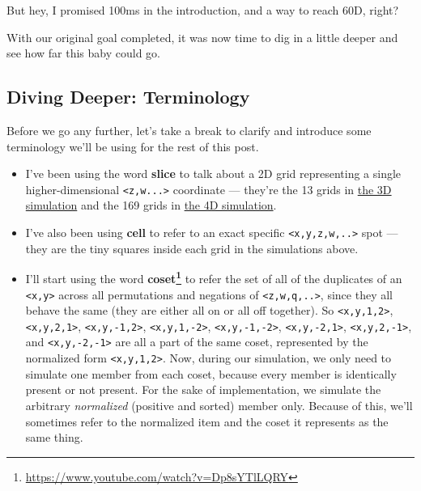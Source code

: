 \documentclass[]{article}
\renewcommand{\href}[2]{#2\footnote{\url{#1}}}
\begin{document}
But hey, I promised 100ms in the introduction, and a way to reach 60D, right?

With our original goal completed, it was now time to dig in a little deeper and
see how far this baby could go.

\hypertarget{diving-deeper-terminology}{%
\subsection{Diving Deeper: Terminology}\label{diving-deeper-terminology}}

Before we go any further, let's take a break to clarify and introduce some
terminology we'll be using for the rest of this post.

\begin{itemize}
\item
  I've been using the word \textbf{slice} to talk about a 2D grid representing a
  single higher-dimensional \texttt{\textless{}z,w...\textgreater{}} coordinate
  --- they're the 13 grids in \protect\hyperlink{gol3D}{the 3D simulation} and
  the 169 grids in \protect\hyperlink{gol4D}{the 4D simulation}.
\item
  I've also been using \textbf{cell} to refer to an exact specific
  \texttt{\textless{}x,y,z,w,..\textgreater{}} spot --- they are the tiny
  squares inside each grid in the simulations above.
\item
  I'll start using the word
  \textbf{\href{https://www.youtube.com/watch?v=Dp8sYTlLQRY}{coset}} to refer
  the set of all of the duplicates of an \texttt{\textless{}x,y\textgreater{}}
  across all permutations and negations of
  \texttt{\textless{}z,w,q,..\textgreater{}}, since they all behave the same
  (they are either all on or all off together). So
  \texttt{\textless{}x,y,1,2\textgreater{}},
  \texttt{\textless{}x,y,2,1\textgreater{}},
  \texttt{\textless{}x,y,-1,2\textgreater{}},
  \texttt{\textless{}x,y,1,-2\textgreater{}},
  \texttt{\textless{}x,y,-1,-2\textgreater{}},
  \texttt{\textless{}x,y,-2,1\textgreater{}},
  \texttt{\textless{}x,y,2,-1\textgreater{}}, and
  \texttt{\textless{}x,y,-2,-1\textgreater{}} are all a part of the same coset,
  represented by the normalized form \texttt{\textless{}x,y,1,2\textgreater{}}.
  Now, during our simulation, we only need to simulate one member from each
  coset, because every member is identically present or not present. For the
  sake of implementation, we simulate the arbitrary \emph{normalized} (positive
  and sorted) member only. Because of this, we'll sometimes refer to the
  normalized item and the coset it represents as the same thing.

\end{itemize}
\end{document}
